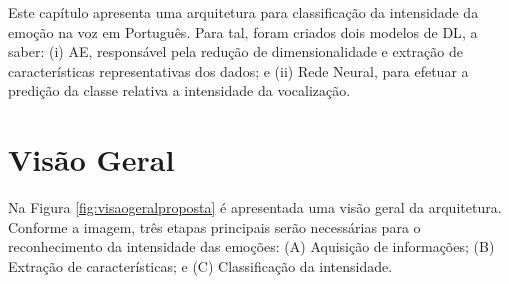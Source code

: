 


Este capítulo apresenta uma arquitetura para classificação da intensidade da emoção na voz em Português. Para tal, foram criados dois modelos de \acrshort{DL}, a saber: (i) \acrshort{AE}, responsável pela redução de dimensionalidade e extração de características representativas dos dados; e (ii) Rede Neural, para efetuar a predição da classe relativa a intensidade da vocalização.\\


\section{Visão Geral}

Na Figura \ref{fig:visaogeralproposta} é apresentada uma visão geral da arquitetura. Conforme a imagem, três etapas principais serão necessárias para o reconhecimento da intensidade das emoções: (A) Aquisição de informações; (B) Extração de características; e (C) Classificação da intensidade.

